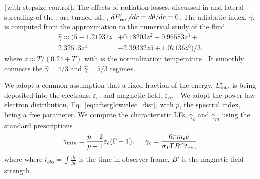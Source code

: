 (with stepsize control). 
%
The effects of radiation losses, discussed in \citet{Nava:2013} and lateral 
spreading of the \blast{}, \citep[\eg][]{Granot:2012} are turned off,
\ie, $d E'_{\rm rad}/dr = d\theta / dr = 0$.
%
The adiabatic index, $\hat{\gamma}$, is computed from the approximation to the 
numerical study of the \trans{} fluid \citep{Service:1986}
%
\begin{eqnarray}
\hat{\gamma} \approx (5 - 1.21937z &+ 0.18203z^2 - 0.96583z^3 + \\
2.32513z^4 &- 2.39332z 5 + 1.07136z^6)/3.
\end{eqnarray}
% 
where $z \approx T/(0.24 + T)$ with is the normalization temperature
\citep{Peer:2012}.
%
It smoothly connects the 
$\hat{\gamma}=4/3$ and $\hat{\gamma}=5/3$ regimes. 


We adopt a common assumption that a fixed fraction of the \blast{} 
energy, $E'_{\rm int},$ is being deposited into the electrons, 
$\varepsilon_e$, and magnetic field, $\varepsilon_B$, \citep[\eg][]{Dermer:1997pv}. 
%
We adopt the power-law electron distribution, Eq.~\eqref{eq:afterglow:elec_dist}, 
with $p$, the spectral index, being a free parameter.
%
We compute the characteristic \acp{LF}, $\gamma_c$ and $\gamma_m$ using the standard
prescriptions \citep[\eg][]{Dermer:2008ev}
%
\begin{equation}
\label{eq:afterglow:gmin_gc}
\gamma_{min} = \frac{p - 2}{p - 1}  \varepsilon_e (\Gamma - 1) , \hspace{5mm} \gamma_c = \frac{6 \pi m_e c }{\sigma_T \Gamma B^{'2} t_{\rm obs}}\, 
\end{equation}
%
where where $t_{obs} = \int \frac{dr}{\beta c}$ is the time in 
observer frame, $B'$ is the magnetic field strength.

